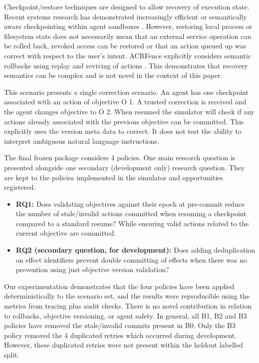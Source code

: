\documentclass[conference]{IEEEtran}
\begin{document}
Checkpoint/restore techniques are designed to allow recovery of execution state. Recent systems research has demonstrated increasingly efficient or semantically aware checkpointing within agent sandboxes \cite{dong2026,wu2026}. However, restoring local process or filesystem state does not necessarily mean that an external service operation can be rolled back, revoked access can be restored or that an action queued up was correct with respect to the user's intent. ACRFence explicitly considers semantic rollbacks using replay and reviving of actions \cite{zheng2026}. This demonstrates that recovery semantics can be complex and is not novel in the context of this paper.

This scenario presents a single correction scenario. An agent has one checkpoint associated with an action of objective O 1. A trusted correction is received and the agent changes objective to O 2. When resumed the simulator will check if any actions already associated with the previous objective can be committed. This explicitly uses the version meta data to correct. It does not test the ability to interpret ambiguous natural language instructions.

The final frozen package considers 4 policies. One main research question is presented alongside one secondary (development only) research question. They are kept to the policies implemented in the simulator and opportunities registered.
\begin{itemize}
\item \textbf{RQ1:} Does validating objectives against their epoch at pre-commit reduce the number of stale/invalid actions committed when resuming a checkpoint compared to a standard resume? While ensuring valid actions related to the current objective are committed.
\item \textbf{RQ2 (secondary question, for development):} Does adding deduplication on effect identifiers prevent double committing of effects when there was no prevention using just objective version validation?
\end{itemize}

Our experimentation demonstrates that the four policies have been applied deterministically to the scenario set, and the results were reproducible using the metrics from tracing plus audit checks. There is no novel contribution in relation to rollbacks, objective versioning, or agent safety. In general, all B1, B2 and B3 policies have removed the stale/invalid commits present in B0. Only the B3 policy removed the 4 duplicated retries which occurred during development. However, these duplicated retries were not present within the heldout labelled split.
\end{document}

